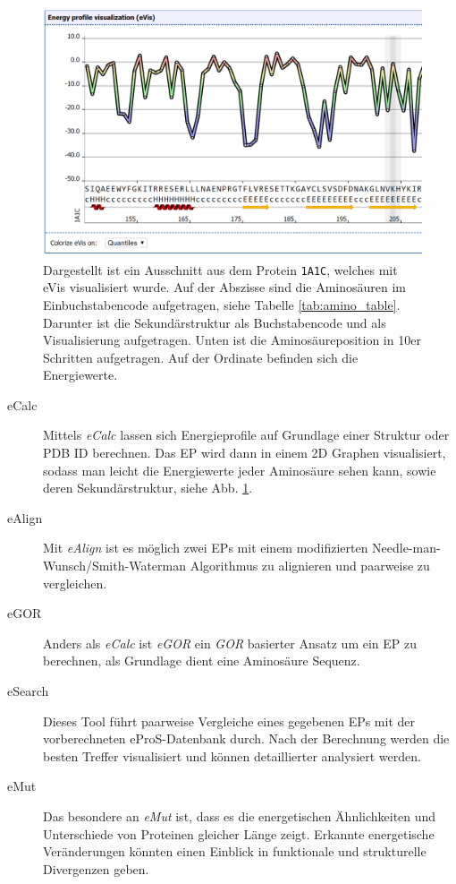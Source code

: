 \begin{figure}
\includegraphics[width=.95\textwidth]{images/ePros.png}
\caption{Dargestellt ist ein Ausschnitt aus dem Protein \texttt{1A1C}, welches mit \ac{eVis} visualisiert wurde. Auf der Abszisse sind die Aminosäuren im Einbuchstabencode aufgetragen, siehe Tabelle \ref{tab:amino_table}. Darunter ist die Sekundärstruktur als Buchstabencode und als Visualisierung aufgetragen. Unten ist die Aminosäureposition in 10er Schritten aufgetragen. Auf der Ordinate befinden sich die Energiewerte.}
\label{fig:epros}
\end{figure}

\begin{description}
\item[eCalc]
Mittels \emph{eCalc} lassen sich Energieprofile auf Grundlage einer Struktur oder \ac{PDB} ID berechnen. Das EP wird dann in einem 2D Graphen visualisiert, sodass man leicht die Energiewerte jeder Aminosäure sehen kann, sowie deren Sekundärstruktur, siehe Abb. \ref{fig:epros}.
\item[eAlign]
Mit \emph{eAlign} ist es möglich zwei EPs mit einem modifizierten Needle-man-Wunsch/Smith-Waterman Algorithmus zu alignieren und paarweise zu vergleichen.
\item[eGOR]
Anders als \emph{eCalc} ist \emph{eGOR} ein \emph{GOR} \cite{Garnier.1996} basierter Ansatz um ein EP zu berechnen, als Grundlage dient eine Aminosäure Sequenz.
\item[eSearch]
Dieses Tool führt paarweise Vergleiche eines gegebenen EPs mit der vorberechneten eProS-Datenbank durch. Nach der Berechnung werden die besten Treffer visualisiert und können detaillierter analysiert werden.
\item[eMut]
Das besondere an \emph{eMut} ist, dass es die energetischen Ähnlichkeiten und Unterschiede von Proteinen gleicher Länge zeigt. Erkannte energetische Veränderungen könnten einen Einblick in funktionale und strukturelle Divergenzen geben.
\end{description}


